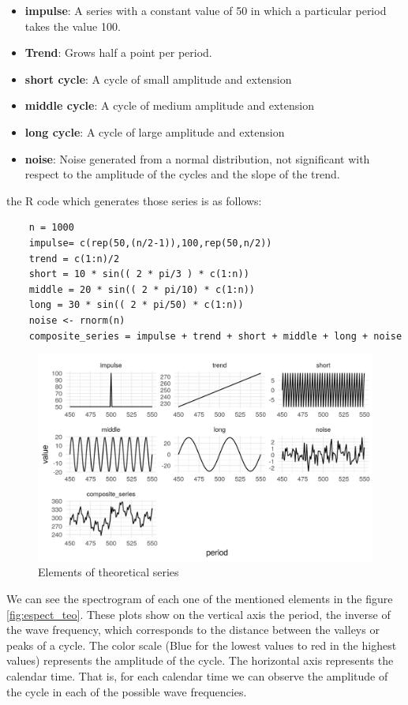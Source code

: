 \documentclass[a4paper,10cpi]{article}
\begin{document}
	
	\begin{itemize}
		
		\item \textbf{impulse}: A series with a constant value of 50 in which a particular period takes the value 100.
		\item \textbf{Trend}: Grows half a point per period.
		\item \textbf{short cycle}: A cycle of small amplitude and extension
		\item \textbf{middle cycle}: A cycle of medium amplitude and extension
		\item \textbf{long cycle}: A cycle of large amplitude and extension
		\item \textbf{noise}: Noise generated from a normal distribution, not significant with respect to the amplitude of the cycles and the slope of the trend.
	\end{itemize}
	
	the R code which generates those series is as follows:
	
	\begin{lstlisting}
	n = 1000
	impulse= c(rep(50,(n/2-1)),100,rep(50,n/2))
	trend = c(1:n)/2
	short = 10 * sin(( 2 * pi/3 ) * c(1:n))
	middle = 20 * sin(( 2 * pi/10) * c(1:n))
	long = 30 * sin(( 2 * pi/50) * c(1:n))
	noise <- rnorm(n)
	composite_series = impulse + trend + short + middle + long + noise
	\end{lstlisting}
	
	
	\begin{figure}[H]
		\centering
		\includegraphics[width=\linewidth]{serie_teorica_en.PNG}
		\caption{Elements of theoretical series} \label{fig:serie_teorica}
	\end{figure}
	
	We can see the spectrogram of each one of the mentioned elements in the figure \ref{fig:espect_teo}. These plots show on the vertical axis the period, the inverse of the wave frequency, which corresponds to the distance between the valleys or peaks of a cycle. The color scale (Blue for the lowest values to red in the highest values) represents the amplitude of the cycle. The horizontal axis represents the calendar time. That is, for each calendar time we can observe the amplitude of the cycle in each of the possible wave frequencies.
	
\end{document}
